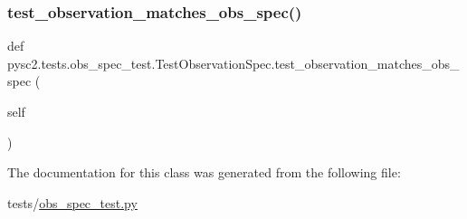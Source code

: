 \subsubsection{\texorpdfstring{test\+\_\+observation\+\_\+matches\+\_\+obs\+\_\+spec()}{test\_observation\_matches\_obs\_spec()}}
{\footnotesize\ttfamily def pysc2.\+tests.\+obs\+\_\+spec\+\_\+test.\+Test\+Observation\+Spec.\+test\+\_\+observation\+\_\+matches\+\_\+obs\+\_\+spec (\begin{DoxyParamCaption}\item[{}]{self }\end{DoxyParamCaption})}



The documentation for this class was generated from the following file\+:\begin{DoxyCompactItemize}
\item 
tests/\mbox{\hyperlink{obs__spec__test_8py}{obs\+\_\+spec\+\_\+test.\+py}}\end{DoxyCompactItemize}
